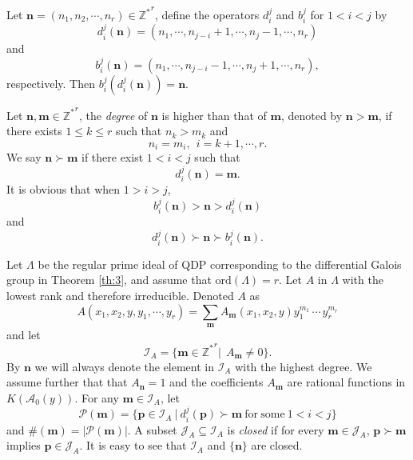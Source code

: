 \documentclass[preprint, 12pt]{elsarticle}
\numberwithin{equation}{section}
\newcommand{\A}{\mathcal{A}}
\begin{document}
Let $\mathbf{n} = (n_1,n_2,\cdots, n_r)\in {\mathbb{Z}^*}^r$,
define the operators $d_i^j$ and $b_i^j$ for $1<i<j$ by
\begin{equation}
d_i^j(\mathbf{n}) = (n_1,\cdots, n_{j-i}+1,\cdots,n_j-1,\cdots,n_r)
\end{equation}
and
\begin{equation}
b_i^j(\mathbf{n}) = (n_1,\cdots,n_{j-i}-1,\cdots,n_j+1,\cdots,n_r),
\end{equation}
respectively.
Then $b_{i}^j(d_i^j(\mathbf{n})) = \mathbf{n}$. 

Let $\mathbf{n},
\mathbf{m}\in {\mathbb{Z}^*}^r$, the \textit{degree} of
$\mathbf{n}$ is higher than that of $\mathbf{m}$, denoted by
$\mathbf{n}
> \mathbf{m}$, if there exists $1\leq k\leq r$ such that $n_k > m_k$ and
$$n_i = m_i,\ \ i = k+1, \cdots, r.$$
We say $\mathbf{n} \succ \mathbf{m}$ if there exist $1 < i < j$
such that
$$d_i^j(\mathbf{n}) = \mathbf{m}.$$
It is obvious that when $1 > i> j$,
\begin{equation}
\label{eq:a.11} b_i^j(\mathbf{n}) > \mathbf{n} > d_i^j(\mathbf{n})
\end{equation}
and
\begin{equation}
\label{eq:a.12} d_i^j(\mathbf{n}) \succ \mathbf{n} \succ
b_i^j(\mathbf{n}).
\end{equation}

Let $\Lambda$ be the regular prime ideal of QDP 
corresponding to the differential Galois group in Theorem
\ref{th:3}, and assume that $\mathrm{ord}(\Lambda) = r$. Let $A$
in $\Lambda$ with the lowest rank and therefore irreducible. Denoted $A$ as
$$A(x_1,x_2,y,y_1,\cdots, y_r) = \sum_{\mathbf{m}}A_{\mathbf{m}}(x_1,x_2,y)y_1^{m_1}\,\cdots\, y_r^{m_r}$$
and let
$$\mathcal{I}_A = \{\mathbf{m}\in {\mathbb{Z}^*}^r|\ \ A_{\mathbf{m}}\not=0\}.$$
By $\mathbf{n}$ we will always denote the element in $\mathcal{I}_A$ with the highest
degree. We assume further that that $A_{\mathbf{n}} = 1$ and
the coefficients $A_{\mathbf{m}}$ are rational functions
in $K(\A_0(y))$. For any $\mathbf{m}\in \mathcal{I}_A$, let
\begin{equation}
\label{eq:a.13} \mathcal{P}(\mathbf{m}) = \{\mathbf{p}\in \mathcal{I}_A\ |\
d_i^j(\mathbf{p})\succ \mathbf{m}\ \mathrm{for\ some}\ 1< i<j\}
\end{equation}
 and
$\#(\mathbf{m}) = |\mathcal{P}(\mathbf{m})|$. A subset $\mathcal{J}_A\subseteq \mathcal{I}_A$ is
\textit{closed} if for every $\mathbf{m}\in \mathcal{J}_A$, $\mathbf{p}\succ
\mathbf{m}$ implies $\mathbf{p}\in \mathcal{J}_A$. It is easy to see that $\mathcal{I}_A$
and $\{\mathbf{n}\}$ are closed.
\end{document}
